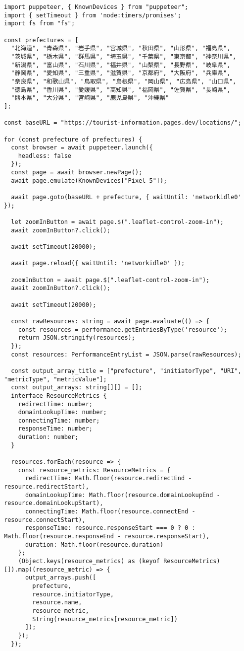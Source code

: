 \begin{lstlisting}[caption={PuppeteerとResource Timing APIを用いたズーム時の画像の読み込み時間の計測},label={lst:PuppeteerとResource Timing APIを用いたズーム時の画像の読み込み時間の計測}]
import puppeteer, { KnownDevices } from "puppeteer";
import { setTimeout } from 'node:timers/promises';
import fs from "fs";

const prefectures = [
  "北海道", "青森県", "岩手県", "宮城県", "秋田県", "山形県", "福島県",
  "茨城県", "栃木県", "群馬県", "埼玉県", "千葉県", "東京都", "神奈川県",
  "新潟県", "富山県", "石川県", "福井県", "山梨県", "長野県", "岐阜県",
  "静岡県", "愛知県", "三重県", "滋賀県", "京都府", "大阪府", "兵庫県",
  "奈良県", "和歌山県", "鳥取県", "島根県", "岡山県", "広島県", "山口県",
  "徳島県", "香川県", "愛媛県", "高知県", "福岡県", "佐賀県", "長崎県",
  "熊本県", "大分県", "宮崎県", "鹿児島県", "沖縄県"
];

const baseURL = "https://tourist-information.pages.dev/locations/";

for (const prefecture of prefectures) {
  const browser = await puppeteer.launch({
    headless: false
  });
  const page = await browser.newPage();
  await page.emulate(KnownDevices["Pixel 5"]);

  await page.goto(baseURL + prefecture, { waitUntil: 'networkidle0' });

  let zoomInButton = await page.$(".leaflet-control-zoom-in");
  await zoomInButton?.click();

  await setTimeout(20000);

  await page.reload({ waitUntil: 'networkidle0' });

  zoomInButton = await page.$(".leaflet-control-zoom-in");
  await zoomInButton?.click();

  await setTimeout(20000);

  const rawResources: string = await page.evaluate(() => {
    const resources = performance.getEntriesByType('resource');
    return JSON.stringify(resources);
  });
  const resources: PerformanceEntryList = JSON.parse(rawResources);

  const output_array_title = ["prefecture", "initiatorType", "URI", "metricType", "metricValue"];
  const output_arrays: string[][] = [];
  interface ResourceMetrics {
    redirectTime: number;
    domainLookupTime: number;
    connectingTime: number;
    responseTime: number;
    duration: number;
  }

  resources.forEach(resource => {
    const resource_metrics: ResourceMetrics = {
      redirectTime: Math.floor(resource.redirectEnd - resource.redirectStart),
      domainLookupTime: Math.floor(resource.domainLookupEnd - resource.domainLookupStart),
      connectingTime: Math.floor(resource.connectEnd - resource.connectStart),
      responseTime: resource.responseStart === 0 ? 0 : Math.floor(resource.responseEnd - resource.responseStart),
      duration: Math.floor(resource.duration)
    };
    (Object.keys(resource_metrics) as (keyof ResourceMetrics)[]).map((resource_metric) => {
      output_arrays.push([
        prefecture,
        resource.initiatorType,
        resource.name,
        resource_metric,
        String(resource_metrics[resource_metric])
      ]);
    });
  });


\end{lstlisting}
